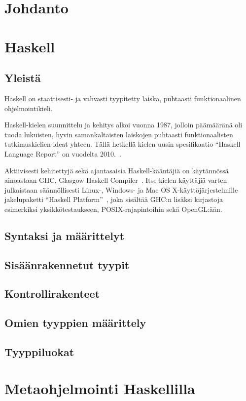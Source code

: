 \section{Johdanto}
\section{Haskell}
\subsection{Yleistä}
Haskell on staattisesti- ja vahvasti tyypitetty laiska, puhtaasti funktionaalinen ohjelmointikieli.

Haskell-kielen suunnittelu ja kehitys alkoi vuonna 1987,
jolloin päämääränä oli tuoda lukuisten, hyvin samankaltaisten laiskojen puhtaasti funktionaalisten tutkimuskielien ideat yhteen.
Tällä hetkellä kielen uusin spesifikaatio ``Haskell Language Report'' on vuodelta 2010.~\cite{HaskellReport2010}.

Aktiivisesti kehitettyjä sekä ajantasaisia Haskell-kääntäjiä on käytännössä ainoastaan
GHC, Glasgow Haskell Compiler~\cite{GHC}.
Itse kielen käyttäjiä varten julkaistaan säännöllisesti Linux-, Windows- ja
Mac OS X-käyttöjärjestelmille  jakelupaketti ``Haskell Platform''~\cite{HaskellPlatform},
joka sisältää GHC:n lisäksi kirjastoja esimerkiksi yksikkötestaukseen, POSIX-rajapintoihin
sekä OpenGL:ään.

\subsection{Syntaksi ja määrittelyt}
\subsection{Sisäänrakennetut tyypit}
\subsection{Kontrollirakenteet}
\subsection{Omien tyyppien määrittely}
\subsection{Tyyppiluokat}

\section{Metaohjelmointi Haskellilla}
